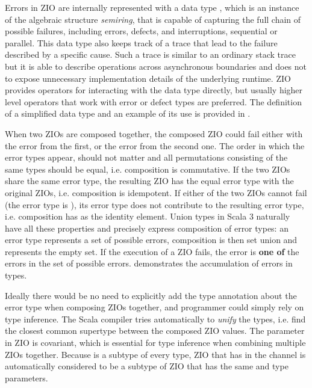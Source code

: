 Errors in ZIO are internally represented with a data type , which is an instance of the algebraic structure \emph{semiring}, that is capable of capturing the full chain of possible failures, including errors, defects, and interruptions, sequential or parallel. This data type also keeps track of a trace that lead to the failure described by a specific cause. Such a trace is similar to an ordinary stack trace but it is able to describe operations across asynchronous boundaries and does not to expose unnecessary implementation details of the underlying runtime. ZIO provides operators for interacting with the  data type directly, but usually higher level operators that work with error or defect types are preferred. The definition of a simplified  data type and an example of its use is provided in .



When two ZIOs are composed together, the composed ZIO could fail either with the error from the first, or the error from the second one. The order in which the error types appear, should not matter and all permutations consisting of the same types should be equal, i.e. composition is commutative. If the two ZIOs share the same error type, the resulting ZIO has the equal error type with the original ZIOs, i.e. composition is idempotent. If either of the two ZIOs cannot fail (the error type is ), its error type does not contribute to the resulting error type, i.e. composition has  as the identity element. Union types in Scala 3 naturally have all these properties and precisely express composition of error types: an error type represents a set of possible errors, composition is then set union and  represents the empty set. If the execution of a ZIO fails, the error is \textbf{one of} the errors in the set of possible errors.  demonstrates the accumulation of errors in types.



Ideally there would be no need to explicitly add the type annotation about the error type when composing ZIOs together, and programmer could simply rely on type inference. The Scala compiler tries automatically to \emph{unify} the types, i.e. find the closest common supertype between the composed ZIO values. The  parameter in ZIO is covariant, which is essential for type inference when combining multiple ZIOs together. Because  is a subtype of every type, ZIO that has  in the  channel is automatically considered to be a subtype of ZIO that has the same  and  type parameters.

